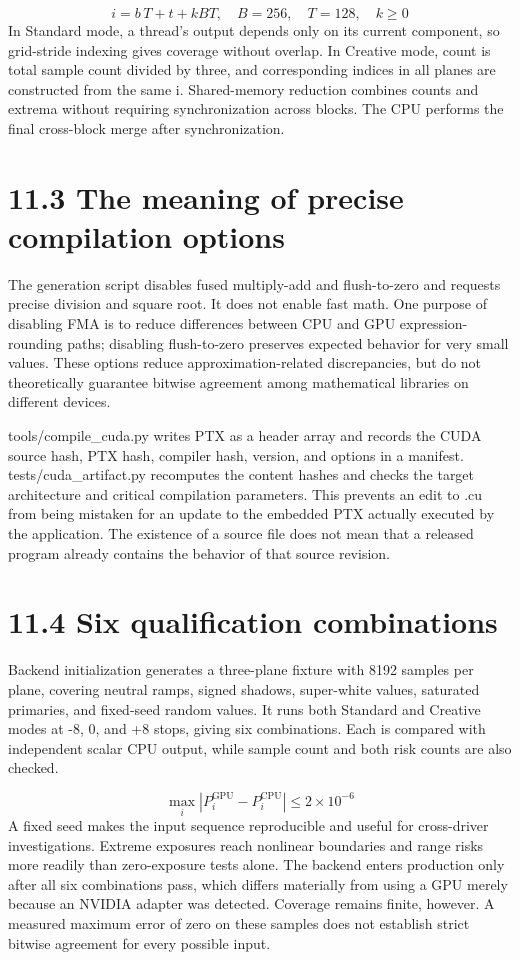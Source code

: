 \documentclass[11pt,a4paper,openany]{book}
\begin{document}
\begin{equation}
i=b\,T+t+kBT,\quad B=256,\quad T=128,\quad k\geq0
\end{equation}
In Standard mode, a thread's output depends only on its current component, so grid-stride indexing gives coverage without overlap. In Creative mode, count is total sample count divided by three, and corresponding indices in all planes are constructed from the same i. Shared-memory reduction combines counts and extrema without requiring synchronization across blocks. The CPU performs the final cross-block merge after synchronization.


\section*{11.3 The meaning of precise compilation options}
The generation script disables fused multiply-add and flush-to-zero and requests precise division and square root. It does not enable fast math. One purpose of disabling FMA is to reduce differences between CPU and GPU expression-rounding paths; disabling flush-to-zero preserves expected behavior for very small values. These options reduce approximation-related discrepancies, but do not theoretically guarantee bitwise agreement among mathematical libraries on different devices.

tools/compile\_cuda.py writes PTX as a header array and records the CUDA source hash, PTX hash, compiler hash, version, and options in a manifest. tests/cuda\_artifact.py recomputes the content hashes and checks the target architecture and critical compilation parameters. This prevents an edit to .cu from being mistaken for an update to the embedded PTX actually executed by the application. The existence of a source file does not mean that a released program already contains the behavior of that source revision.


\section*{11.4 Six qualification combinations}
Backend initialization generates a three-plane fixture with 8192 samples per plane, covering neutral ramps, signed shadows, super-white values, saturated primaries, and fixed-seed random values. It runs both Standard and Creative modes at -8, 0, and +8 stops, giving six combinations. Each is compared with independent scalar CPU output, while sample count and both risk counts are also checked.


\begin{equation}
\max_i|P_i^{\mathrm{GPU}}-P_i^{\mathrm{CPU}}|\leq2\times10^{-6}
\end{equation}
A fixed seed makes the input sequence reproducible and useful for cross-driver investigations. Extreme exposures reach nonlinear boundaries and range risks more readily than zero-exposure tests alone. The backend enters production only after all six combinations pass, which differs materially from using a GPU merely because an NVIDIA adapter was detected. Coverage remains finite, however. A measured maximum error of zero on these samples does not establish strict bitwise agreement for every possible input.
\end{document}
